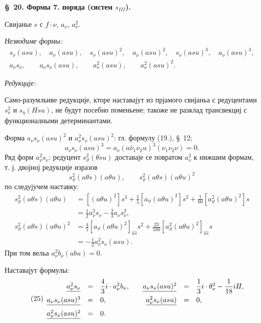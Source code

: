 ﻿\documentclass[11pt]{article}
\begin{document}
\begin{center}
\textbf{\S\ 20. \quad Формы 7. поряда (систем $s_{III}$).}
\end{center}

Свијанье $s$ с $f\cdot \nu$, $a_{\nu}$, $a_{\nu}^2$.

\noindent\textit{Незводиме формы:}
\[
\begin{gathered}
s_{\nu}(asu),\quad a_{\nu}(asu),\quad s_{\nu}(asu)^2,\quad a_{\nu}(asu)^2,\quad
s_{\nu}(asu)^3,\quad a_{\nu}(asu)^3,\\
a_{\nu} s_{\nu},\qquad a_{\nu} s_{\nu}(asu),\qquad a_{\nu}^2(asu),\qquad a_{\nu}^2(asu)^2.
\end{gathered}
\]

\noindent\textit{Редукције:}

Само-разумльиве редукције, кторе наставајут из прјамого свијаньа с редуцентами $s_{\nu}^2$ и $s_\eta(Hsu)$, не будут посебно поменьене; такоже не разклад трансвекциј с функционалными детерминантами.

Форма $a_{\nu}s_{\nu}(asu)^2$ и $a_{\nu}^2s_{\nu}(asu)^2$: гл. формулу (19.), \S\ 12;
\[
a_{\nu}s_{\nu}(asu)^3=a_{\nu}(a\widehat{\nu}_1\nu_2u)^3(\nu_1\nu_2\nu)=0.
\]
Ряд форм $a_{\nu}^2s_{\nu}$: редуцент $s_\vartheta^2(\theta su)$ доставаје се повратом $a_{\nu}^2$ к нижшим формам, т. ј. двојној редукције изразов
\[
s_\vartheta^2(a\theta s)(a\theta u),\qquad
s_\vartheta^2(a\theta s)(a\theta u)^2
\]
по следујучем наставку:
\[
\begin{aligned}
s_\vartheta^2(a\theta s)(a\theta u)
&=[(a\theta u)^2]s^3+\frac15[a_\vartheta(a\theta u)^2]s^2+\frac1{60}[a_\vartheta^2(a\theta u)^2]s\\
&=\frac12a_{\nu}^2s_{\nu}-\frac23a_{\nu}s_{\nu}^2,\\
s_\vartheta^2(a\theta s)(a\theta u)^2
&=\frac45[a_\vartheta(a\theta u)^2]_{\widehat{us}}s^2+\frac{23}{180}[a_\vartheta^2(a\theta u)^2]_{\widehat{us}}s\\
&=-\frac12a_{\nu}^2s_{\nu}(asu).
\end{aligned}
\]
При том вельа $a_{\nu}^2b_{\nu}(abu)=0$.

Наставајут формулы:
\[
\tag{25}
\begin{array}{rcl@{\qquad}rcl}
\underline{a_{\nu}^2s_{\nu}}&=&\dfrac43i\cdot a_{\nu}^2b_{\nu},
& \underline{a_{\nu}s_{\nu}(asu)^2}&=&\dfrac13i\cdot\theta_{\nu}^2-\dfrac1{18}iH,\\[0.7em]
\underline{a_{\nu}s_{\nu}(asu)^3}&=&0,
& \underline{a_{\nu}^2s_{\nu}(asu)}&=&0,\\[0.7em]
\underline{a_{\nu}^2s_{\nu}(asu)^2}&=&0.
\end{array}
\]
\end{document}
